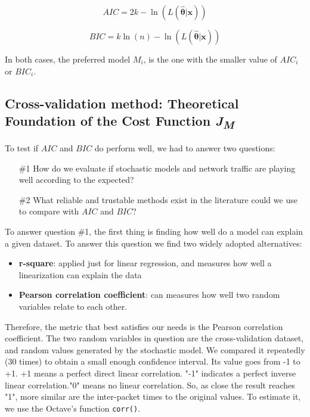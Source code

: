 \begin{equation}
\label{eq:aic}
AIC = 2k - \ln(L(\boldsymbol{\hat{\theta}}|\boldsymbol{x}))
\end{equation}

\begin{equation}
\label{eq:bic}
BIC = k\ln(n) - \ln(L(\boldsymbol{\hat{\theta}}|\boldsymbol{x}))
\end{equation}

In both cases, the preferred model $M_i$, is the one with the smaller value of $AIC_i$ or $BIC_i$.


\subsection{Cross-validation method: Theoretical Foundation of the Cost Function \textit{J\textsubscript{M}}}

To test if $AIC$ and $BIC$ do perform well, we had to answer two questions:

\begin{itemize}
\item[\#1] How do we evaluate if stochastic models and network traffic are playing well according to the expected?
\item[\#2] What reliable and trustable methods exist in the literature could we use to compare with $AIC$ and $BIC$?
\end{itemize}

To answer question \#1, the first thing is finding how well do a model can explain a given dataset. To answer this question  we find two widely adopted alternatives:

\begin{itemize}
\item \textbf{r-square}: applied just for linear regression, and measures how well a linearization can explain the data
\item \textbf{Pearson correlation coefficient}: can measures how well two random variables relate to each other.
\end{itemize}

Therefore, the metric that best satisfies our needs is the Pearson correlation coefficient.  The two random variables in question are the cross-validation dataset, and random values generated by the stochastic model.  We compared it repeatedly (30 times) to obtain a small enough confidence interval.  Its value goes from -1 to +1. +1 means a perfect direct linear correlation. "-1" indicates a perfect inverse linear correlation."0" means no linear correlation. So, as close the result reaches "1", more similar are the inter-packet times to the original values. To estimate it, we use the Octave’s function \texttt{corr()}. 


